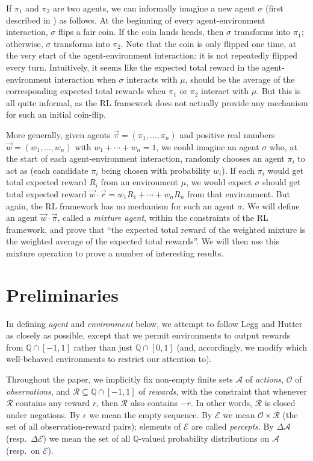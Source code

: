 \documentclass[twoside]{article}
\begin{document}
If $\pi_1$ and $\pi_2$ are two agents, we can informally imagine a new agent
$\sigma$ (first described in \cite{alexander2021reward})
as follows. At the beginning of every agent-environment interaction,
$\sigma$ flips a fair coin. If the coin lands heads, then $\sigma$ transforms into
$\pi_1$; otherwise, $\sigma$ transforms into $\pi_2$. Note that the coin is only
flipped one time, at the very start of the agent-environment interaction:
it is not repeatedly flipped every turn. Intuitively, it seems like the
expected total reward in the agent-environment interaction
when $\sigma$ interacts with $\mu$, should be the average
of the corresponding expected total rewards when $\pi_1$ or $\pi_2$ interact
with $\mu$. But this is all quite informal, as the RL
framework does not actually provide any mechanism for such an initial
coin-flip.

More generally, given agents $\vec{\pi}=(\pi_1,\ldots,\pi_n)$ and positive real
numbers
$\vec{w}=(w_1,\ldots,w_n)$ with $w_1+\cdots+w_n=1$, we could imagine an agent $\sigma$
who, at the start of each agent-environment interaction, randomly chooses
an agent $\pi_i$ to act as (each candidate $\pi_i$ being chosen with probability
$w_i$). If each $\pi_i$ would get total expected reward $R_i$ from an environment
$\mu$, we would expect $\sigma$ should get total expected reward
$\vec{w}\cdot \vec{r}=w_1R_1+\cdots+w_nR_n$ from that environment.
But again, the RL
framework has no mechanism for such an agent $\sigma$. We will define
an agent $\vec{w}\cdot\vec{\pi}$, called a \emph{mixture agent},
within the constraints
of the RL framework, and prove that ``the expected total reward of the
weighted mixture is the weighted average of the expected total rewards''.
We will then use this mixture operation to prove a number of interesting results.

\section{Preliminaries}

In defining \emph{agent} and \emph{environment} below, we attempt to follow
Legg and Hutter \cite{legg2007universal} as closely as possible,
except that we permit environments to output rewards from $\mathbb Q \cap [-1,1]$
rather than just $\mathbb Q\cap [0,1]$ (and, accordingly, we modify which well-behaved
environments to restrict our attention to).

Throughout the paper, we implicitly
fix non-empty finite sets $\mathcal A$ of \emph{actions},
$\mathcal O$ of \emph{observations},
and $\mathcal R\subseteq \mathbb Q\cap [-1,1]$ of \emph{rewards},
with the constraint that
whenever $\mathcal R$ contains any reward $r$, then $\mathcal R$
also contains $-r$. In other words, $\mathcal R$ is closed under negations.
By $\epsilon$ we mean the empty sequence.
By $\mathcal E$ we mean $\mathcal O\times\mathcal R$ (the set of all observation-reward
pairs); elements of $\mathcal E$ are called \emph{percepts}.
By $\Delta\mathcal A$ (resp.\ $\Delta\mathcal E$) we mean the set of all $\mathbb Q$-valued
probability distributions on $\mathcal A$ (resp.\ on $\mathcal E$).
\end{document}
